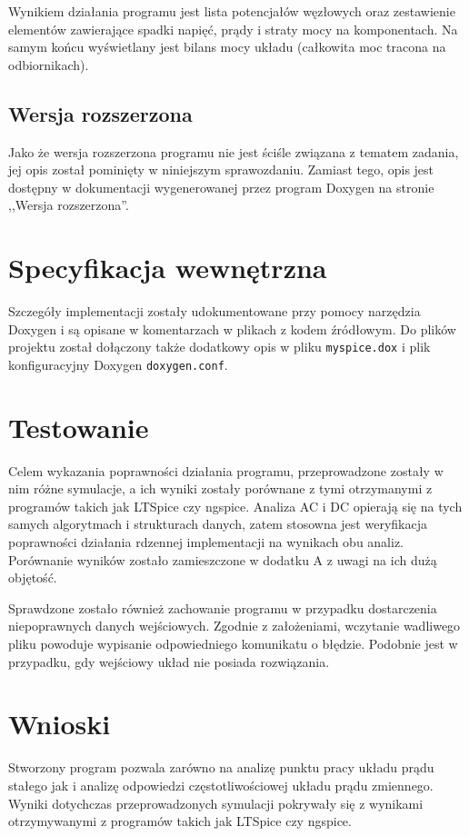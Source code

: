 \documentclass[11pt, final]{article}
\begin{document}
Wynikiem działania programu jest lista potencjałów węzłowych oraz zestawienie elementów zawierające spadki napięć, prądy i straty mocy na komponentach. Na samym końcu wyświetlany jest bilans mocy układu (całkowita moc tracona na odbiornikach).


\subsection{Wersja rozszerzona}
Jako że wersja rozszerzona programu nie jest ściśle związana z tematem zadania, jej opis został pominięty
w niniejszym sprawozdaniu. Zamiast tego, opis jest dostępny w dokumentacji wygenerowanej przez program Doxygen na stronie ,,Wersja rozszerzona''.




\section{Specyfikacja wewnętrzna}
Szczegóły implementacji zostały udokumentowane przy pomocy narzędzia Doxygen i są opisane w komentarzach w plikach z kodem źródłowym.
Do plików projektu został dołączony także dodatkowy opis w pliku \texttt{myspice.dox} i plik konfiguracyjny Doxygen \texttt{doxygen.conf}.




\section{Testowanie}
Celem wykazania poprawności działania programu, przeprowadzone zostały w nim różne symulacje, a ich wyniki zostały porównane z tymi otrzymanymi z programów takich jak LTSpice\cite{ltspice} czy ngspice\cite{ngspice}. Analiza AC i DC opierają się na tych samych algorytmach i strukturach danych, zatem stosowna jest weryfikacja poprawności działania rdzennej implementacji na wynikach obu analiz. Porównanie wyników zostało zamieszczone w dodatku A z uwagi na ich dużą objętość.

Sprawdzone zostało również zachowanie programu w przypadku dostarczenia niepoprawnych danych wejściowych. Zgodnie z założeniami, wczytanie wadliwego pliku powoduje wypisanie odpowiedniego komunikatu o błędzie. Podobnie jest w przypadku, gdy wejściowy układ nie posiada rozwiązania.



\section{Wnioski}
Stworzony program pozwala zarówno na analizę punktu pracy układu prądu stałego jak i analizę odpowiedzi częstotliwościowej układu prądu zmiennego. Wyniki dotychczas przeprowadzonych symulacji pokrywały się z wynikami otrzymywanymi z programów takich jak LTSpice czy ngspice.
\end{document}
